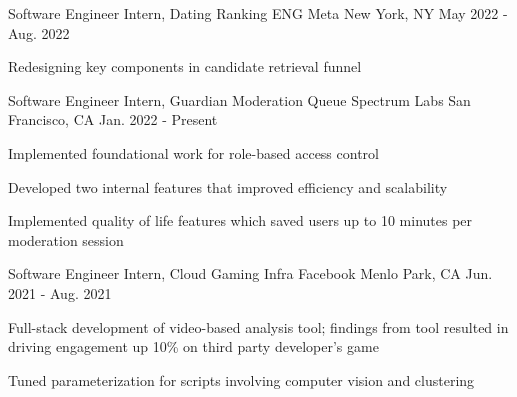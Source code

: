 

\begin{cventries}
  \cventry
    {Software Engineer Intern, Dating Ranking ENG} %
    {Meta} %
    {New York, NY} %
    {May 2022 - Aug. 2022} %
    {
      \begin{cvitems} %
        \item {Redesigning key components in candidate retrieval funnel}
      \end{cvitems}
    }

  \cventry
    {Software Engineer Intern, Guardian Moderation Queue} %
    {Spectrum Labs} %
    {San Francisco, CA} %
    {Jan. 2022 - Present} %
    {
      \begin{cvitems} %
         \item {Implemented foundational work for role-based access control}
        \item {Developed two internal features that improved efficiency and scalability}
        \item {Implemented quality of life features which saved users up to 10 minutes per moderation session}
      \end{cvitems}
    }

  \cventry
    {Software Engineer Intern, Cloud Gaming Infra} %
    {Facebook} %
    {Menlo Park, CA} %
    {Jun. 2021 - Aug. 2021} %
    {
      \begin{cvitems} %
        \item {Full-stack development of video-based analysis tool; findings from tool resulted in driving engagement up 10\% on third party developer's game}
        \item {Tuned parameterization for scripts involving computer vision and clustering}
      \end{cvitems}
    }


\end{cventries}
